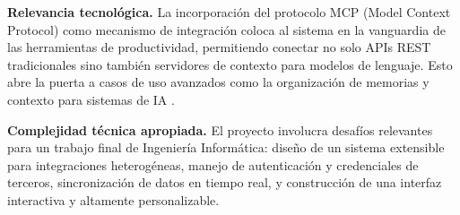 \textbf{Relevancia tecnológica.} La incorporación del protocolo MCP (Model Context Protocol) como mecanismo de integración coloca al sistema en la vanguardia de las herramientas de productividad, permitiendo conectar no solo APIs REST tradicionales sino también servidores de contexto para modelos de lenguaje. Esto abre la puerta a casos de uso avanzados como la organización de memorias y contexto para sistemas de IA \cite{mcp_intro}.

\textbf{Complejidad técnica apropiada.} El proyecto involucra desafíos relevantes para un trabajo final de Ingeniería Informática: diseño de un sistema extensible para integraciones heterogéneas, manejo de autenticación y credenciales de terceros, sincronización de datos en tiempo real, y construcción de una interfaz interactiva y altamente personalizable.

